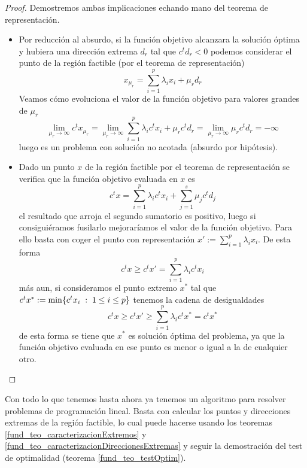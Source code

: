\begin{proof}Demostremos ambas implicaciones echando mano del teorema de representación.
	\begin{itemize}
		\item[\bra] Por reducción al absurdo, si la función objetivo alcanzara la solución óptima y hubiera una dirección extrema $d_r$ tal que $c^td_r<0$ podemos considerar el punto de la región factible (por el teorema de representación)
		\begin{equation*}
			x_{\mu_r}=\sum_{i=1}^{p}\lambda_ix_i+\mu_rd_r
		\end{equation*}
		Veamos cómo evoluciona el valor de la función objetivo para valores grandes de $\mu_r$
		\begin{equation*}
			\lim\limits_{\mu_r\to\infty}c^tx_{\mu_r}=\lim\limits_{\mu_r\to\infty}\sum_{i=1}^{p}\lambda_ic^tx_i+\mu_rc^td_r=\lim\limits_{\mu_r\to\infty}\mu_rc^td_r=-\infty
		\end{equation*}
		luego es un problema con solución no acotada (absurdo por hipótesis).
		\item[\bla]Dado un punto $x$ de la región factible por el teorema de representación se verifica que la función objetivo evaluada en $x$ es\begin{equation*}
			c^tx=\sum_{i=1}^{p}\lambda_ic^tx_i+\sum_{j=1}^{s}\mu_jc^td_j
		\end{equation*} el resultado que arroja el segundo sumatorio es positivo, luego si consiguiéramos fusilarlo mejoraríamos el valor de la función objetivo. Para ello basta con coger el punto con representación $x':=\sum_{i=1}^{p}\lambda_ix_i$. De esta forma
		\begin{equation*}
			c^tx\geq c^tx'=\sum_{i=1}^{p}\lambda_ic^tx_i
		\end{equation*} más aun, si consideramos el punto extremo $x^*$ tal que $c^tx^*:=\min\{c^tx_i\;:\; 1\leq i\leq p\}$ tenemos la cadena de desigualdades \begin{equation*}
		c^tx\geq c^tx'\geq \sum_{i=1}^{p}\lambda_ic^tx^*=c^tx^*
	\end{equation*} de esta forma se tiene que $x^*$ es solución óptima del problema, ya que la función objetivo evaluada en ese punto es menor o igual a la de cualquier otro.\qedhere
	\end{itemize}
\end{proof}
\begin{obs}
	Con todo lo que tenemos hasta ahora ya tenemos un algoritmo para resolver problemas de programación lineal. Basta con calcular los puntos y direcciones extremas de la región factible, lo cual puede hacerse usando los teoremas \ref{fund_teo_caracterizacionExtremos} y \ref{fund_teo_caracterizacionDireccionesExtremas} y seguir la demostración del test de optimalidad (teorema \ref{fund_teo_testOptim}).
\end{obs}